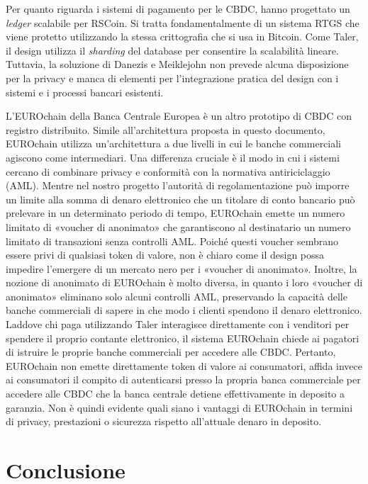\documentclass{article}
\begin{document}
Per quanto riguarda i sistemi di pagamento per le CBDC, \cite{Danezis}
hanno progettato un \textit{ledger} scalabile per RSCoin. Si tratta
fondamentalmente di un sistema RTGS che viene protetto utilizzando la
stessa crittografia che si usa in Bitcoin. Come Taler, il design utilizza
il \textit{sharding} del database per consentire la scalabilità lineare.
Tuttavia, la soluzione di Danezis e Meiklejohn non prevede alcuna
disposizione per la privacy e manca di elementi per l'integrazione
pratica del design con i sistemi e i processi bancari esistenti.

L'EUROchain della Banca Centrale Europea\cite[vedi][]{ECB} è un altro
prototipo di CBDC con registro distribuito. Simile all'architettura
proposta in questo documento, EUROchain utilizza un'architettura a due
livelli in cui le banche commerciali agiscono come intermediari. Una
differenza cruciale è il modo in cui i sistemi cercano di combinare
privacy e conformità con la normativa antiriciclaggio (AML). Mentre nel
nostro progetto l'autorità di regolamentazione può imporre un limite
alla somma di denaro elettronico che un titolare di conto bancario può
prelevare in un determinato periodo di tempo, EUROchain emette un numero
limitato di «voucher di anonimato» che garantiscono al destinatario un
numero limitato di transazioni senza controlli AML. Poiché questi voucher
sembrano essere privi di qualsiasi token di valore, non è chiaro come
il design possa impedire l'emergere di un mercato nero per i «voucher
di anonimato». Inoltre, la nozione di anonimato di EUROchain è molto
diversa, in quanto i loro «voucher di anonimato» eliminano solo alcuni
controlli AML, preservando la capacità delle banche commerciali di
sapere in che modo i clienti spendono il denaro elettronico. Laddove chi
paga utilizzando Taler interagisce direttamente con i venditori per
spendere il proprio contante elettronico, il sistema EUROchain chiede
ai pagatori di istruire le proprie banche commerciali per accedere alle
CBDC. Pertanto, EUROchain non emette direttamente token di valore ai
consumatori, affida invece ai consumatori il compito di autenticarsi
presso la propria banca commerciale per accedere alle CBDC che la
banca centrale detiene effettivamente in deposito a garanzia. Non è
quindi evidente quali siano i vantaggi di EUROchain in termini di
privacy, prestazioni o sicurezza rispetto all'attuale denaro in deposito.

\section{Conclusione}\label{7.-conclusione}
\end{document}
